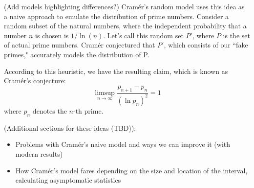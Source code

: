 \documentclass[conference]{IEEEtran}
\begin{document}

(Add models highlighting differences?)
Cram\'er's random model uses this idea as a naive approach to emulate the distribution of prime numbers. Consider a random subset of the natural numbers, where the independent probability that a number $n$ is chosen is $1 / \ln(n)$. Let's call this random set $P'$, where $P$ is the set of actual prime numbers. Cram\'er conjectured that $P'$, which consists of our ``fake primes," accurately models the distribution of P. 

According to this heuristic, we have the resulting claim, which is known as Cram\'er's conjecture:
\[\limsup_{n \to \infty} \frac{p_{n + 1} - p_n}{(\ln p_n)^2} = 1\]
where $p_n$ denotes the $n$-th prime.

(Additional sections for these ideas (TBD)):
\begin{itemize}
  \item Problems with Cram\'er's naive model and ways we can improve it (with modern results)
  \item How Cram\'er's model fares depending on the size and location of the interval, calculating asymptomatic statistics
\end{itemize}
\end{document}
